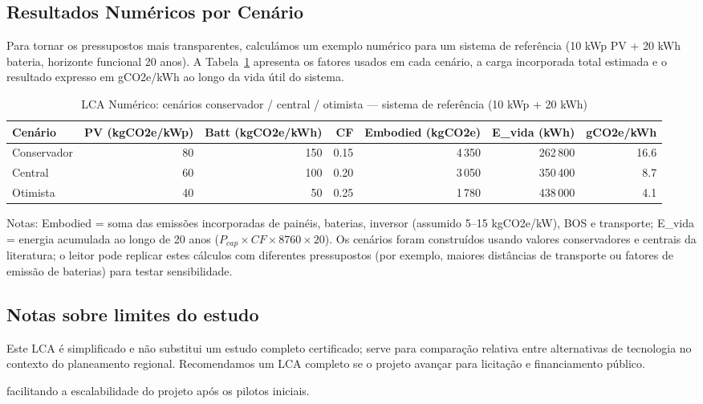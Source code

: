 \documentclass[12pt, a4paper]{article}
\begin{document}
{{{{{{{{{{{{\subsection{Resultados Numéricos por Cenário}
Para tornar os pressupostos mais transparentes, calculámos um exemplo numérico para um
sistema de referência (10 kWp PV + 20 kWh bateria, horizonte funcional 20 anos). A Tabela~\ref{tab:lca_numeric}
apresenta os fatores usados em cada cenário, a carga incorporada total estimada e o resultado
expresso em gCO2e/kWh ao longo da vida útil do sistema.

\begin{table}[H]
\centering
\caption{LCA Numérico: cenários conservador / central / otimista — sistema de referência (10 kWp + 20 kWh)}
\label{tab:lca_numeric}
\footnotesize
\begin{tabular}{lrrrrrr}
\toprule
\textbf{Cenário} & \textbf{PV (kgCO2e/kWp)} & \textbf{Batt (kgCO2e/kWh)} & \textbf{CF} & \textbf{Embodied (kgCO2e)} & \textbf{E\_vida (kWh)} & \textbf{gCO2e/kWh} \\
\midrule
Conservador & 80 & 150 & 0.15 & 4\,350 & 262\,800 & 16.6 \\
Central & 60 & 100 & 0.20 & 3\,050 & 350\,400 & 8.7 \\
Otimista & 40 & 50 & 0.25 & 1\,780 & 438\,000 & 4.1 \\
\bottomrule
\end{tabular}
\end{table}

\noindent Notas: Embodied = soma das emissões incorporadas de painéis, baterias, inversor (assumido 5--15 kgCO2e/kW), BOS e transporte; E\_vida = energia acumulada ao longo de 20 anos ($P_{cap}\times CF\times 8760\times 20$). Os cenários foram construídos usando valores conservadores e centrais da literatura; o leitor pode replicar estes cálculos com diferentes pressupostos (por exemplo, maiores distâncias de transporte ou fatores de emissão de baterias) para testar sensibilidade.

\subsection{Notas sobre limites do estudo}
Este LCA é simplificado e não substitui um estudo completo certificado; serve para
comparação relativa entre alternativas de tecnologia no contexto do planeamento regional.
Recomendamos um LCA completo se o projeto avançar para licitação e financiamento público.

facilitando a escalabilidade do projeto após os pilotos iniciais.

}}}}}}}}}}}}
\end{document}
